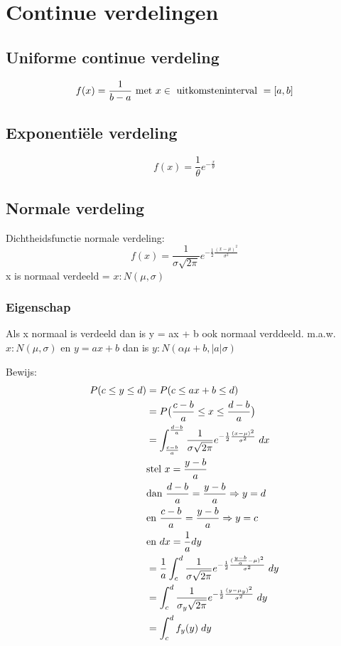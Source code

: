 \documentclass[12pt]{report}
\begin{document}
\chapter{Continue verdelingen}
\section{Uniforme continue verdeling}
$$f(x) = \frac{1}{b - a} \hbox{ met } x \in \hbox{ uitkomsteninterval } = [a, b]$$
\section{Exponentiële verdeling}
$$f(x) = \frac{1}{\theta}e^{-\frac{x}{\theta}}$$
\section{Normale verdeling}
Dichtheidsfunctie normale verdeling:
$$f(x) = \frac{1}{\sigma\sqrt{2\pi}}e^{-\frac{1}{2}\frac{(x - \mu)^2}{\sigma^2}}$$
x is normaal verdeeld = $x : N(\mu, \sigma)$
\subsection{Eigenschap}
Als x normaal is verdeeld dan is y = ax + b ook normaal verddeeld. m.a.w. $x : N(\mu, \sigma)$ en $y = ax + b$ dan is $y : N(\alpha\mu + b, |a|\sigma)$

Bewijs:
\begin{equation*}
 \begin{split}
  P(c \leq y \leq d) & = P(c \leq ax + b \leq d) \\
                     & = P\big(\frac{c - b}{a} \leq x \leq \frac{d-b}{a}\big) \\
                     & = \int_{\frac{c - b}{a}}^{\frac{d-b}{a}} \frac{1}{\sigma\sqrt{2\pi}}e^{-\frac{1}{2}\frac{(x - \mu)^2}{\sigma^2}} \; dx  \\
                     & \hbox{stel } x = \frac{y-b}{a} \\
                     & \hbox{dan } \frac{d-b}{a} = \frac{y-b}{a} \Rightarrow y = d \\
                      & \hbox{en } \frac{c-b}{a} = \frac{y-b}{a} \Rightarrow y = c \\
                      & \hbox{en } dx = \frac{1}{a}dy \\
                     & = \frac{1}{a}\int_c^d \frac{1}{\sigma\sqrt{2\pi}}e^{-\frac{1}{2}\frac{(\frac{y-b}{a} - \mu)^2}{\sigma^2}} \; dy \\
                     & = \int_c^d \frac{1}{\sigma_y\sqrt{2\pi}}
                        e^{-\frac
                                    {1}
                                    {2}
                            \frac
                                    {(y - \mu_y)^2}
                                    {\sigma^2}} \; dy \\
                    & = \int_c^d
                            f_y(y)\; dy
 \end{split}
\end{equation*}
\end{document}
